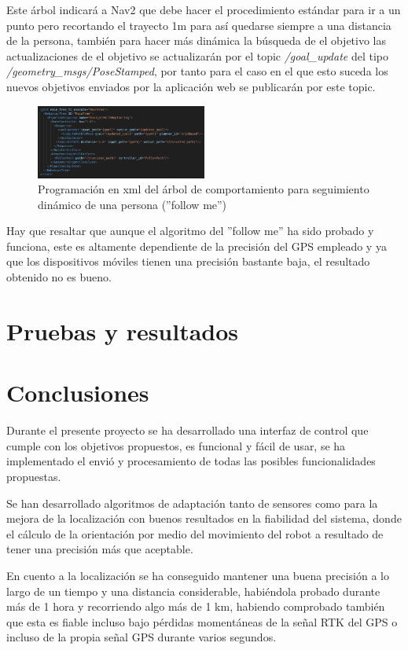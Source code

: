 Este árbol indicará a Nav2 que debe hacer el procedimiento estándar para ir a un punto pero recortando el trayecto 1m para así quedarse siempre a una distancia de la persona, también para hacer más dinámica 
la búsqueda de el objetivo las actualizaciones de el objetivo se actualizarán por el topic \textit{/goal\_update} del tipo \textit{/geometry\_msgs/PoseStamped}, por tanto 
para el caso en el que esto suceda los nuevos objetivos enviados por la aplicación web se publicarán por este topic.

\begin{figure}[H]
    \centering
    \includegraphics[width=0.5\textwidth]{images/dynamic_object_bt.png}
    \caption{Programación en xml del árbol de comportamiento para seguimiento dinámico de una persona (''follow me'')}
    \label{fig:follow_me}
\end{figure}

Hay que resaltar que aunque el algoritmo del ''follow me'' ha sido probado y funciona, este es altamente dependiente de la precisión del GPS 
empleado y ya que los dispositivos móviles tienen una precisión bastante baja, el resultado obtenido no es bueno.
\cleardoublepage
\chapter{Pruebas y resultados}

\chapter{Conclusiones}
Durante el presente proyecto se ha desarrollado una interfaz de control que cumple con los objetivos propuestos, es funcional y fácil de usar, 
se ha implementado el envió y procesamiento de todas las posibles funcionalidades propuestas.

Se han desarrollado algoritmos de adaptación tanto de sensores como para la mejora de la localización con buenos resultados en la fiabilidad del sistema, donde el cálculo 
de la orientación por medio del movimiento del robot a resultado de tener una precisión más que aceptable.

En cuento a la localización se ha conseguido mantener una buena precisión a lo largo de un tiempo y una distancia considerable, habiéndola probado durante más de 1 hora 
y recorriendo algo más de 1 km, habiendo comprobado también
que esta es fiable incluso bajo pérdidas momentáneas de la señal RTK del GPS o incluso de la propia señal GPS durante varios segundos.

